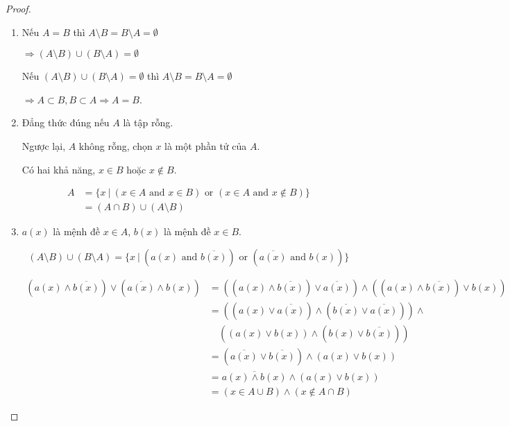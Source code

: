 \documentclass[class=linearalgebra,crop=false]{standalone}
\begin{document}
\begin{proof}
    \begin{enumerate}[label = (\alph*)]
        \item Nếu $A = B$ thì $A\setminus B = B\setminus A = \emptyset$

        \par $\Rightarrow (A\setminus B)\cup (B\setminus A) = \emptyset$

        \par Nếu $(A\setminus B)\cup (B\setminus A) = \emptyset$ thì $A\setminus B = B\setminus A = \emptyset$

        \par $\Rightarrow A\subset B, B\subset A\Rightarrow A = B$.

        \item Đẳng thức đúng nếu $A$ là tập rỗng.

        \par Ngược lại, $A$ không rỗng, chọn $x$ là một phần tử của $A$.

        \par Có hai khả năng, $x\in B$ hoặc $x\not\in B$.

        \begin{align*}
            A &= \{ x\ |\ (x\in A \text{ and } x\in B)\text{ or }(x\in A \text{ and } x\not\in B) \} \\
              &= (A\cap B) \cup (A\setminus B)
        \end{align*}

        \item $a(x)$ là mệnh đề $x \in A$, $b(x)$ là mệnh đề $x\in B$.

        \[
            (A\setminus B)\cup (B\setminus A)=\{ x\ |\ (a(x) \text{ and } \overline{b(x)}) \text{ or } (\overline{a(x)} \text{ and } b(x)) \}
        \]

        \begin{align*}
            (a(x) \wedge \overline{b(x)}) \vee (\overline{a(x)} \wedge b(x)) &= ((a(x)\wedge \overline{b(x)})\vee \overline{a(x)}) \wedge ((a(x)\wedge \overline{b(x)})\vee b(x)) \\
            &= ((a(x)\vee \overline{a(x)}) \wedge (\overline{b(x)}\vee\overline{a(x)}))\wedge \\
            &\quad ((a(x)\vee b(x))\wedge (b(x)\vee \overline{b(x)})) \\
            &= (\overline{a(x)}\vee\overline{b(x)}) \wedge (a(x) \vee b(x)) \\
            &= \overline{a(x)\wedge b(x)} \wedge (a(x)\vee b(x)) \\
            &= (x\in A\cup B) \wedge (x\not\in A\cap B)
        \end{align*}


\end{enumerate}
\end{proof}
\end{document}
